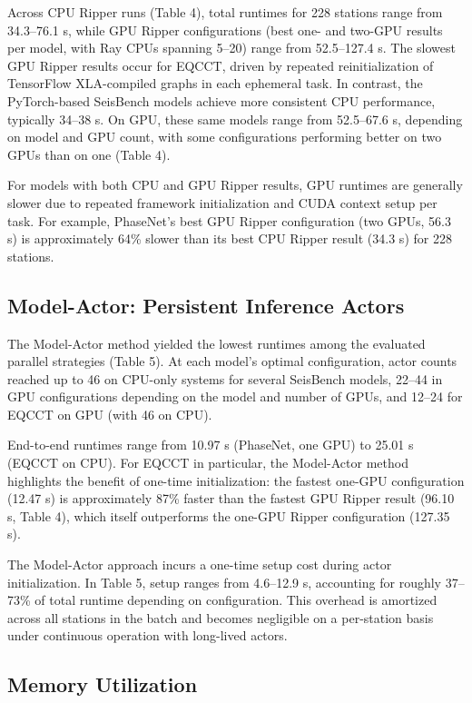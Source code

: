 Across CPU Ripper runs (Table 4), total runtimes for 228 stations range from 34.3–76.1 s, while GPU Ripper configurations (best one- and two-GPU results per model, with Ray CPUs spanning 5–20) range from 52.5–127.4 s. The slowest GPU Ripper results occur for EQCCT, driven by repeated reinitialization of TensorFlow XLA-compiled graphs in each ephemeral task. In contrast, the PyTorch-based SeisBench models achieve more consistent CPU performance, typically 34–38 s. On GPU, these same models range from 52.5–67.6 s, depending on model and GPU count, with some configurations performing better on two GPUs than on one (Table 4).

For models with both CPU and GPU Ripper results, GPU runtimes are generally slower due to repeated framework initialization and CUDA context setup per task. For example, PhaseNet’s best GPU Ripper configuration (two GPUs, 56.3 s) is approximately 64\% slower than its best CPU Ripper result (34.3 s) for 228 stations.

\subsection{Model-Actor: Persistent Inference Actors}

The Model-Actor method yielded the lowest runtimes among the evaluated parallel strategies (Table 5). At each model’s optimal configuration, actor counts reached up to 46 on CPU-only systems for several SeisBench models, 22–44 in GPU configurations depending on the model and number of GPUs, and 12–24 for EQCCT on GPU (with 46 on CPU).

End-to-end runtimes range from 10.97 s (PhaseNet, one GPU) to 25.01 s (EQCCT on CPU). For EQCCT in particular, the Model-Actor method highlights the benefit of one-time initialization: the fastest one-GPU configuration (12.47 s) is approximately 87\% faster than the fastest GPU Ripper result (96.10 s, Table 4), which itself outperforms the one-GPU Ripper configuration (127.35 s).

The Model-Actor approach incurs a one-time setup cost during actor initialization. In Table 5, setup ranges from 4.6–12.9 s, accounting for roughly 37–73\% of total runtime depending on configuration. This overhead is amortized across all stations in the batch and becomes negligible on a per-station basis under continuous operation with long-lived actors.

\subsection{Memory Utilization}

